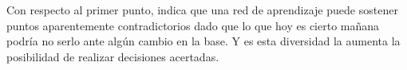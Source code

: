 Con respecto al primer punto, \citeauthor{Conectivismo_Siemens2005} indica que una red de aprendizaje puede sostener puntos aparentemente contradictorios dado que lo que hoy es cierto mañana podría no serlo ante algún cambio en la base. Y es esta diversidad la aumenta la posibilidad de realizar decisiones acertadas. \citep{Conectivismo_Siemens2005}
